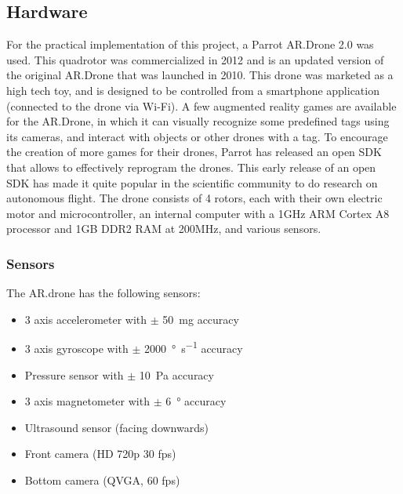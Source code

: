 \subsection{Hardware}
For the practical implementation of this project, a Parrot AR.Drone 2.0 was used. This quadrotor was commercialized in 2012 and is an updated version of the original AR.Drone that was launched in 2010. This drone was marketed as a high tech toy, and is designed to be controlled from a smartphone application (connected to the drone via Wi-Fi). A few augmented reality games are available for the AR.Drone, in which it can visually recognize some predefined tags using its cameras, and interact with objects or other drones with a tag. To encourage the creation of more games for their drones, Parrot has released an open SDK that allows to effectively reprogram the drones. This early release of an open SDK has made it quite popular in the scientific community to do research on autonomous flight. The drone consists of 4 rotors, each with their own electric motor and microcontroller, an internal computer with a 1GHz ARM Cortex A8 processor and 1GB DDR2 RAM at 200MHz, and various sensors.

\subsubsection{Sensors}
The AR.drone has the following sensors:
\begin{itemize}
  \item 3 axis accelerometer with $\pm$  \SI{50}{\milli\gram} accuracy
  \item 3 axis gyroscope with $\pm$ \SI{2000}{\degree\per\second} accuracy
  \item Pressure sensor with $\pm$ \SI{10}{\pascal} accuracy
  \item 3 axis magnetometer with $\pm$ \SI{6}{\degree} accuracy
  \item Ultrasound sensor (facing downwards)
  \item Front camera (HD 720p 30 fps)
  \item Bottom camera (QVGA, 60 fps)
\end{itemize}

